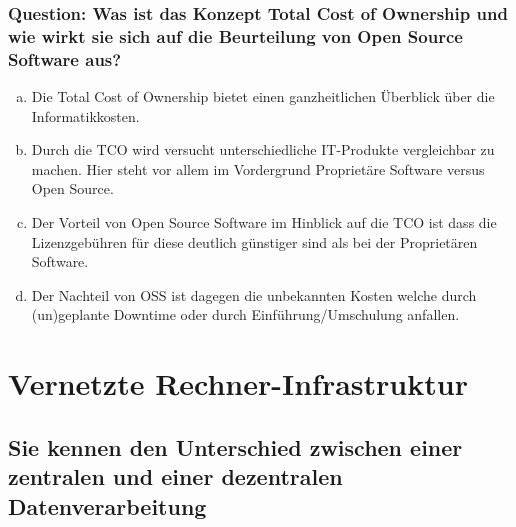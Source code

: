 \documentclass{article}
\begin{document}
\begin{adjustwidth}{2em}{2em}
\begin{adjustwidth}{2em}{2em}
\begin{adjustwidth}{1em}{}
				\subsubsection*{Question: Was ist das Konzept Total Cost of Ownership und wie wirkt sie sich auf die Beurteilung von Open Source Software aus?}
				\begin{adjustwidth}{1em}{}
					\begin{enumerate}[(a)]
						\item Die Total Cost of Ownership bietet einen ganzheitlichen Überblick über die Informatikkosten.
						\item Durch die TCO wird versucht unterschiedliche IT-Produkte vergleichbar zu machen. Hier steht vor allem im Vordergrund Proprietäre Software versus Open Source.
						\item Der Vorteil von Open Source Software im Hinblick auf die TCO ist dass die Lizenzgebühren für diese deutlich günstiger sind als bei der Proprietären Software.
						\item Der Nachteil von OSS ist dagegen die unbekannten Kosten welche durch (un)geplante Downtime oder durch Einführung/Umschulung anfallen.
					\end{enumerate}
				\end{adjustwidth}
			\end{adjustwidth}
		\end{adjustwidth}
		
		\newpage		
		
		\section{Vernetzte Rechner-Infrastruktur}
		\begin{adjustwidth}{2em}{2em}
			\subsection{Sie kennen den Unterschied zwischen einer zentralen und einer dezentralen Datenverarbeitung}
			\begin{adjustwidth}{1em}{}

\end{adjustwidth}
\end{adjustwidth}
\end{adjustwidth}
\end{document}
